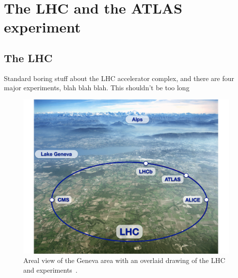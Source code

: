 \chapter[The LHC and the ATLAS experiment][The LHC and ATLAS]
        {The LHC and the ATLAS experiment}
\label{ch:lhc}

\FloatBarrier
\section{The LHC}

{\color{red}Standard boring stuff about the LHC accelerator complex, and there
  are four major experiments, blah blah blah. This shouldn't be too long}

\begin{figure}[ht]
  \centering
  \includegraphics[width=\textwidth, clip=true, trim=0 0 1cm 0]
    {figs/lhc/lhc_aerial.pdf}
  \caption{Areal view of the Geneva area with an overlaid drawing of the LHC
    and experiments~\cite{lhc_aerial}.
  }
  \label{fig:lhc_aerial}
\end{figure}

